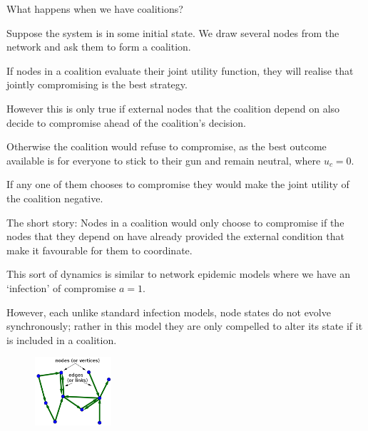 \documentclass[10pt]{beamer}
\begin{document}
\begin{frame}{What happens when we have coalitions?}

Suppose the system is in some initial state. We draw several nodes from the network and ask them to form a coalition.

If nodes in a coalition evaluate their joint utility function, they will realise that jointly compromising is the best strategy.

However this is only true if external nodes that the coalition depend on also decide to compromise ahead of the coalition's decision.

Otherwise the coalition would refuse to compromise, as the best outcome available is for everyone to stick to their gun and remain neutral, where $u_c = 0$.

If any one of them chooses to compromise they would make the joint utility of the coalition negative.

\end{frame}

\begin{frame}
The short story: Nodes in a coalition would only choose to compromise if the nodes that they depend on have already provided the external condition that make it favourable for them to coordinate.

This sort of dynamics is similar to network epidemic models where we have an `infection' of compromise $a=1$.

However, each unlike standard infection models, node states do not evolve synchronously; rather in this model they are only compelled to alter its state if it is included in a coalition.
\begin{figure}[b]
\centering
\includegraphics[height=1in]{directed_network.png}
\end{figure}
\end{frame}
\end{document}
